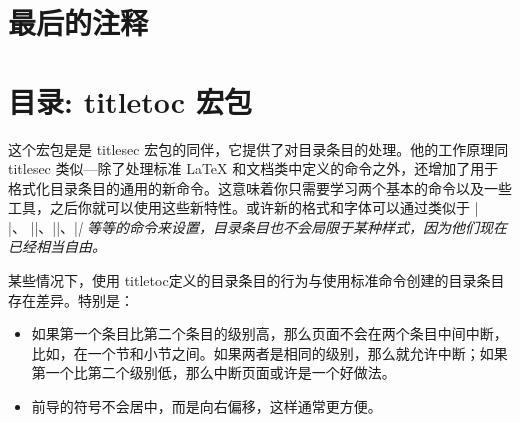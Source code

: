 \documentclass[a4paper,nofonts]{ltxguide}
\begin{document}
\section{最后的注释}


\section{目录: \textsf{titletoc} 宏包}

这个宏包是是 \textsf{titlesec} 宏包的同伴，它提供了对目录条目的处理。他的工作原理同 \textsf{titlesec} 类似---除了处理标准 \LaTeX{} 和文档类中定义的命令之外，还增加了用于格式化目录条目的通用的新命令。这意味着你只需要学习两个基本的命令以及一些工具，之后你就可以使用这些新特性。或许新的格式和字体可以通过类似于 |\\|、 |\markbox|、|\large|、|\itshape| 等等的命令来设置，目录条目也不会局限于某种样式，因为他们现在已经相当自由。

某些情况下，使用 \textsf{titletoc}定义的目录条目的行为与使用标准命令创建的目录条目存在差异。特别是：
\begin{itemize}
\item 如果第一个条目比第二个条目的级别高，那么页面不会在两个条目中间中断，比如，在一个节和小节之间。如果两者是相同的级别，那么就允许中断；如果第一个比第二个级别低，那么中断页面或许是一个好做法。

\item 前导的符号不会居中，而是向右偏移，这样通常更方便。
\end{itemize}
\end{document}
